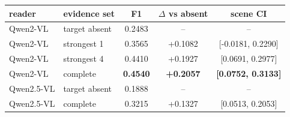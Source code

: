 \begin{tabular}{llccc}
\toprule
reader & evidence set & F1 & $\Delta$ vs absent & scene CI \\
\midrule
Qwen2-VL & target absent & 0.2483 & -- & -- \\
Qwen2-VL & strongest 1 & 0.3565 & +0.1082 & [-0.0181, 0.2290] \\
Qwen2-VL & strongest 4 & 0.4410 & +0.1927 & [0.0691, 0.2977] \\
Qwen2-VL & complete & \textbf{0.4540} & \textbf{+0.2057} & \textbf{[0.0752, 0.3133]} \\
Qwen2.5-VL & target absent & 0.1888 & -- & -- \\
Qwen2.5-VL & complete & 0.3215 & +0.1327 & [0.0513, 0.2053] \\
\bottomrule
\end{tabular}

